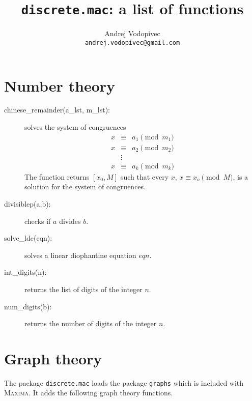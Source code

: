 \documentclass[11pt]{article}
\newcommand{\maxima}{\textsc{Maxima}}
\begin{document}
\title{\texttt{discrete.mac}: a list of functions}
\author{Andrej Vodopivec\\ \texttt{andrej.vodopivec@gmail.com}}
\date{}
\maketitle


\section{Number theory}

\begin{description}
  \item[chinese\_remainder(a\_lst, m\_lst):] solves the system of
    congruences
    \begin{eqnarray*}
      x & \equiv & a_1 \pmod{m_1} \\
      x & \equiv & a_2 \pmod{m_2} \\
        & \vdots &                 \\
      x & \equiv & a_k \pmod{m_k}
    \end{eqnarray*}
    The function returns $[x_0,M]$ such that every $x$, $x\equiv
    x_o\pmod{M}$, is a solution for the system of congruences.
  \item[divisiblep(a,b):] checks if $a$ divides $b$.
  \item[solve\_lde(eqn):] solves a linear diophantine equation $eqn$.
  \item[int\_digits(n):] returns the list of digits of the integer
    $n$.
  \item[num\_digits(b):] returns the number of digits of the integer
    $n$.
\end{description}

\section{Graph theory}

The package \verb|discrete.mac| loads the package \verb|graphs| which
is included with \maxima. It adds the following graph theory
functions.
\end{document}
